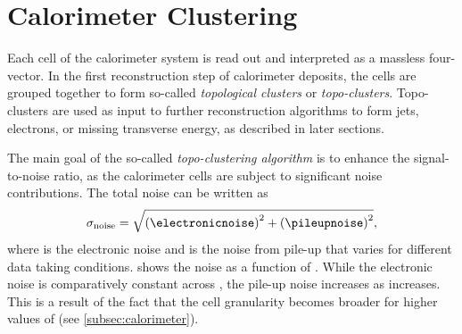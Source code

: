 


\section{Calorimeter Clustering}
\label{sec:calo-clustering}
Each cell of the calorimeter system is read out and interpreted as a massless four-vector. In the first reconstruction step of calorimeter deposits, the cells are grouped together to form so-called \emph{topological clusters} or \emph{topo-clusters}. Topo-clusters are used as input to further reconstruction algorithms to form jets, electrons, or missing transverse energy, as described in later sections.

The main goal of the so-called \emph{topo-clustering algorithm} is to enhance the signal-to-noise ratio, as the calorimeter cells are subject to significant noise contributions. The total noise can be written as
\begin{equation}
    \sigma_{\text{noise}} = \sqrt{ \left( \electronicnoise  \right)^2  + \left( \pileupnoise  \right)^2 },
\end{equation}
where \electronicnoise is the electronic noise and \pileupnoise is the noise from pile-up that varies for different data taking conditions.  shows the noise as a function of \abseta. While the electronic noise is comparatively constant across \abseta, the pile-up noise increases as \abseta increases. This is a result of the fact that the cell granularity becomes broader for higher values of \abseta (see \cref{subsec:calorimeter}).

